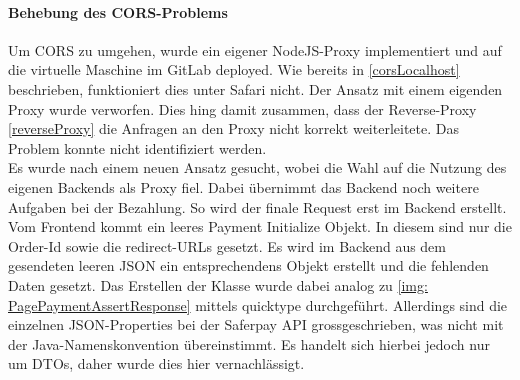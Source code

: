 \paragraph{Behebung des CORS-Problems}\label{behebungCors}
Um CORS zu umgehen, wurde ein eigener NodeJS-Proxy implementiert und auf die virtuelle Maschine im GitLab deployed. Wie bereits in \ref{corsLocalhost} beschrieben, funktioniert dies unter Safari nicht. Der Ansatz mit einem eigenden Proxy wurde verworfen. Dies hing damit zusammen, dass der Reverse-Proxy \ref{reverseProxy} die Anfragen an den Proxy nicht korrekt weiterleitete. Das Problem konnte nicht identifiziert werden. \\ Es wurde nach einem neuen Ansatz gesucht, wobei die Wahl auf die Nutzung des eigenen Backends als Proxy fiel. Dabei übernimmt das Backend noch weitere Aufgaben bei der Bezahlung. So wird der finale Request erst im Backend erstellt. Vom Frontend kommt ein leeres Payment Initialize Objekt. In diesem sind nur die Order-Id sowie die redirect-URLs gesetzt. Es wird im Backend aus dem gesendeten leeren JSON ein entsprechendens Objekt erstellt und die fehlenden Daten gesetzt. Das Erstellen der Klasse wurde dabei analog zu \ref{img: PagePaymentAssertResponse} mittels quicktype durchgeführt. Allerdings sind die einzelnen JSON-Properties bei der Saferpay API grossgeschrieben, was nicht mit der Java-Namenskonvention übereinstimmt. Es handelt sich hierbei jedoch nur um DTOs, daher wurde dies hier vernachlässigt. 
